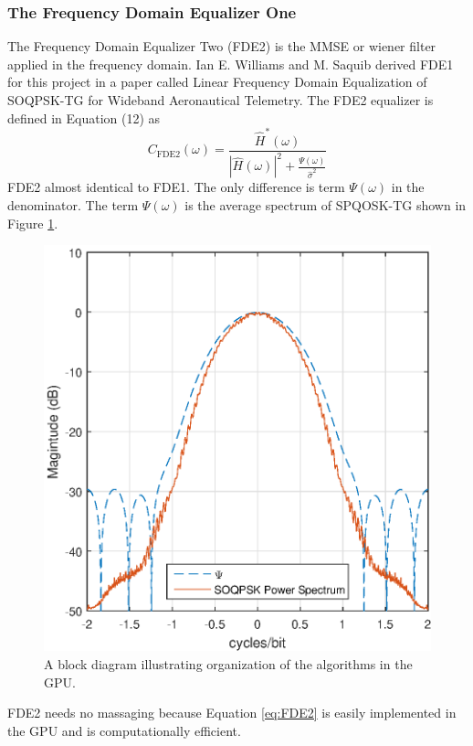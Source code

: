 \subsubsection{The Frequency Domain Equalizer One}
The Frequency Domain Equalizer Two (FDE2) is the MMSE or wiener filter applied in the frequency domain.
Ian E. Williams and M. Saquib derived FDE1 for this project in a paper called Linear Frequency Domain Equalization of SOQPSK-TG for Wideband Aeronautical Telemetry.
The FDE2 equalizer is defined in Equation (12) as
\begin{equation}
C_\text{FDE2}(\omega) = \frac{\hat{H}^\ast(\omega)}{|\hat{H}(\omega)|^2+\frac{\Psi(\omega)}{\hat{\sigma}^2}}
\label{eq:FDE2}
\end{equation}
FDE2 almost identical to FDE1.
The only difference is term $\Psi(\omega)$ in the denominator. 
The term $\Psi(\omega)$ is the average spectrum of SPQOSK-TG shown in Figure \ref{fig:SOQPSK_spectrum}.
\begin{figure}
	\centering\includegraphics[width=5in]{figures/equations/FDE2_spectrum_PSI.eps}
	\caption{A block diagram illustrating organization of the algorithms in the GPU.}
	\label{fig:SOQPSK_spectrum}
\end{figure}
FDE2 needs no massaging because Equation \eqref{eq:FDE2} is easily implemented in the GPU and is computationally efficient.